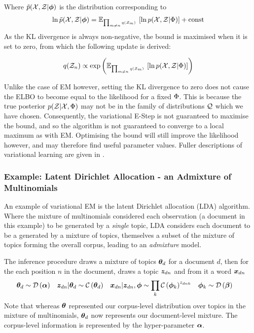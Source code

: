 Where $\tilde{p}({ \mathcal{X} }, { \mathcal{Z} }|{ \bm \phi })$ is the distribution corresponding to
\begin{align}
\ln \tilde{p}({ \mathcal{X} }, { \mathcal{Z} }|{ \bm \phi }) = \mathbb{E}_{ { { \mbox{\tiny ${\prod_{m\neq n} q({ \mathcal{Z} }_m)}$ } } } }\left[ { \ln { p( { \mathcal{X} } ,  { \mathcal{Z} } |  { \Phi } ) } } \right] + \text{const}
\end{align}
As the KL divergence is always non-negative, the bound is maximised when it is set to zero, from which the following update is derived: 

\begin{align}
q({ \mathcal{Z} }_n) \propto \exp\left( { \mathbb{E}_{ { {{ \mbox{\tiny ${\prod_{m\neq n} q({ \mathcal{Z} }_m)}$ } }} } }\left[ { \ln { p( { \mathcal{X} } ,  { \mathcal{Z} } |  { \Phi } ) } } \right] }  \right)
\end{align}

Unlike the case of EM however, setting the KL divergence to zero does not cause the ELBO to become equal to the likelihood for a fixed ${ \Phi }$. This is because the true posterior $p({ \mathcal{Z} } | { \mathcal{X} }, { \Phi })$ may not be in the family of distributions ${ \mathcal{Q} }$ which we have chosen. Consequently, the variational E-Step is not guaranteed to maximise the bound, and so the algorithm is not guaranteed to converge to a local maximum as with EM. Optimising the bound will still improve the likelihood however, and may therefore find useful parameter values. Fuller descriptions of variational learning are given in \cite{Jordan1999a}\cite{Bishop2006}\cite{Tzikas2008}. 

\subsubsection*{Example: Latent Dirichlet Allocation - an Admixture of Multinomials}
\label{sec:chap1:lda}
An example of variational EM is the latent Dirichlet allocation (LDA) algorithm\cite{BleiNgJordan2003}. Where the mixture of multinomials considered each observation (a document in this example) to be generated by a \emph{single} topic, LDA considers each document to be a generated by a mixture of topics, themselves a subset of the mixture of topics forming the overall corpus, leading to an \emph{admixture} model. 

The inference procedure draws a mixture of topics ${ \bm \theta_d }$ for a document $d$, then for the each position $n$ in the document, draws a topic ${ \bm z_{dn} }$ and from it a word ${ \bm x_{dn} }$
\begin{align}
{  \bm \theta _d } & \sim \mathcal{D} \left( {\bm \alpha} \right) &
{ \bm z_{dn} }|{ \bm \theta_d } & \sim \mathcal{C} \left( {{ \bm \theta_d }} \right) & 
{ \bm x_{dn} }|{ \bm z_{dn} }, { \bm \phi } & \sim \prod_k \mathcal{C} \left( {{ \bm \phi }_k} \right)^{{ z_{dnk} }} & 
{ \bm \phi }_k & \sim \mathcal{D} \left( {\bm \beta} \right)
\end{align}
Note that whereas $\bm \theta$ represented our corpus-level distribution over topics in the mixture of multinomials, ${ \bm \theta_d }$ now represents our document-level mixture. The corpus-level information is represented by the hyper-parameter $\bm \alpha$. 

